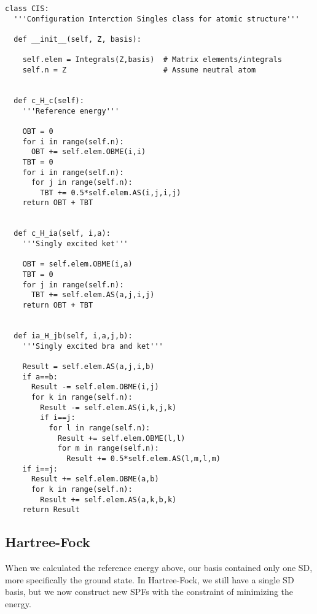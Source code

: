 \lstset{basicstyle=\scriptsize}
\begin{lstlisting}
class CIS:
  '''Configuration Interction Singles class for atomic structure'''

  def __init__(self, Z, basis):

    self.elem = Integrals(Z,basis)  # Matrix elements/integrals
    self.n = Z                      # Assume neutral atom


  def c_H_c(self):
    '''Reference energy'''

    OBT = 0
    for i in range(self.n):
      OBT += self.elem.OBME(i,i)
    TBT = 0
    for i in range(self.n):
      for j in range(self.n):
        TBT += 0.5*self.elem.AS(i,j,i,j)
    return OBT + TBT


  def c_H_ia(self, i,a):
    '''Singly excited ket'''

    OBT = self.elem.OBME(i,a)
    TBT = 0
    for j in range(self.n):
      TBT += self.elem.AS(a,j,i,j)
    return OBT + TBT


  def ia_H_jb(self, i,a,j,b):
    '''Singly excited bra and ket'''

    Result = self.elem.AS(a,j,i,b)
    if a==b:
      Result -= self.elem.OBME(i,j)
      for k in range(self.n):
        Result -= self.elem.AS(i,k,j,k)
        if i==j:
          for l in range(self.n):
            Result += self.elem.OBME(l,l)
            for m in range(self.n):
              Result += 0.5*self.elem.AS(l,m,l,m)
    if i==j:
      Result += self.elem.OBME(a,b)
      for k in range(self.n):
        Result += self.elem.AS(a,k,b,k)
    return Result
\end{lstlisting}

\subsection{Hartree-Fock}
When we calculated the reference energy above, our basis contained only one SD, more specifically the ground state. In Hartree-Fock, we still have a single SD basis, but we now construct new SPFs with the constraint of minimizing the energy. 

